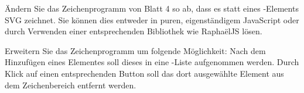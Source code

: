 %
\par Ändern Sie das Zeichenprogramm von Blatt 4 so ab, dass es statt eines
-Elements SVG zeichnet. Sie können dies entweder in puren,
eigenständigem JavaScript oder durch Verwenden einer entsprechenden Bibliothek
wie RaphaëlJS lösen.
%
\par Erweitern Sie das Zeichenprogramm um folgende Möglichkeit: Nach dem
Hinzufügen eines Elementes soll dieses in eine -Liste aufgenommen
werden. Durch Klick auf einen entsprechenden Button soll das dort ausgewählte
Element aus dem Zeichenbereich entfernt werden.